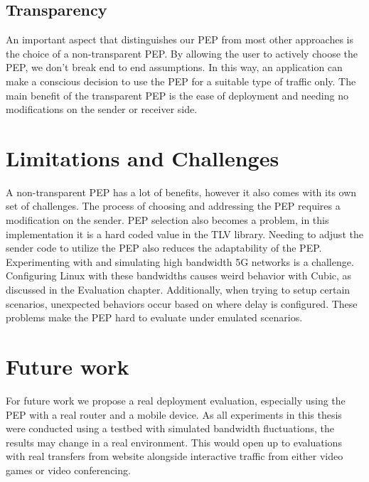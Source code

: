 \documentclass[a4paper,english, 12pt]{report}
\begin{document}
\subsection{Transparency}
An important aspect that distinguishes our PEP from most other approaches is the choice of a non-transparent PEP. By allowing the user to actively choose the PEP, we don't break end to end assumptions. In this way, an application can make a conscious decision to use the PEP for a suitable type of traffic only. The main benefit of the transparent PEP is the ease of deployment and needing no modifications on the sender or receiver side.\\

\section{Limitations and Challenges}

A non-transparent PEP has a lot of benefits, however it also comes with its own set of challenges. The process of choosing and addressing the PEP requires a modification on the sender. PEP selection also becomes a problem, in this implementation it is a hard coded value in the TLV library. Needing to adjust the sender code to utilize the PEP also reduces the adaptability of the PEP.\\

Experimenting with and simulating high bandwidth 5G networks is a challenge. Configuring Linux with these bandwidths causes weird behavior with Cubic, as discussed in the Evaluation chapter. Additionally, when trying to setup certain scenarios, unexpected behaviors occur based on where delay is configured. These problems make the PEP hard to evaluate under emulated scenarios.

\section{Future work}
For future work we propose a real deployment evaluation, especially using the PEP with a real router and a mobile device. As all experiments in this thesis were conducted using a testbed with simulated bandwidth fluctuations, the results may change in a real environment. This would open up to evaluations with real transfers from website alongside interactive traffic from either video games or video conferencing.\\
\end{document}
